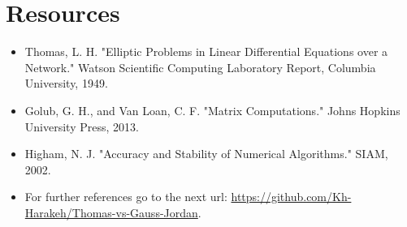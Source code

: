 \documentclass[a4paper,12pt]{article}
\begin{document}
\section*{Resources}
\begin{itemize}
    \item Thomas, L. H. "Elliptic Problems in Linear Differential Equations over a Network." Watson Scientific Computing Laboratory Report, Columbia University, 1949.
    \item Golub, G. H., and Van Loan, C. F. "Matrix Computations." Johns Hopkins University Press, 2013.
    \item Higham, N. J. "Accuracy and Stability of Numerical Algorithms." SIAM, 2002.
    \item For further references go to the next url: \newline\url{https://github.com/Kh-Harakeh/Thomas-vs-Gauss-Jordan}.
\end{itemize}
\end{document}

